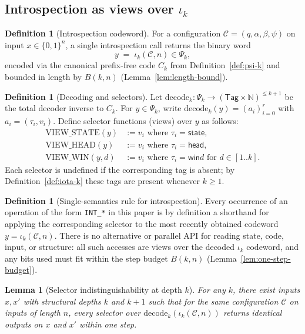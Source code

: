 \documentclass[11pt]{article}
\newtheorem{lemma}[theorem]{Lemma}
\theoremstyle{definition}
\newtheorem{definition}[theorem]{Definition}
\newcommand{\bits}{\{0,1\}}
\begin{document}
\subsection{Introspection as views over $\iota_k$}

\begin{definition}[Introspection codeword]
For a configuration $\mathcal{C}=(q,\alpha,\beta,\psi)$ on input $x\in\bits^n$, a single introspection call returns the binary word
\[
y \;=\; \iota_k(\mathcal{C},n)\in\Psi_k,
\]
encoded via the canonical prefix-free code $C_k$ from Definition~\ref{def:psi-k} and bounded in length by $B(k,n)$ (Lemma~\ref{lem:length-bound}).
\end{definition}

\begin{definition}[Decoding and selectors]
Let $\mathrm{decode}_k: \Psi_k \to (\mathsf{Tag}\times\mathbb{N})^{\le k+1}$ be the total decoder inverse to $C_k$. For $y\in\Psi_k$, write $\mathrm{decode}_k(y)=(a_i)_{i=0}^{r}$ with $a_i=(\tau_i,v_i)$. Define selector functions (views) over $y$ as follows:
\begin{align*}
\mathrm{VIEW\_STATE}(y) &:= v_i \text{ where } \tau_i=\textsf{state}, \\
\mathrm{VIEW\_HEAD}(y) &:= v_i \text{ where } \tau_i=\textsf{head}, \\
\mathrm{VIEW\_WIN}(y,d) &:= v_i \text{ where } \tau_i=\textsf{win}d \text{ for } d\in[1..k].
\end{align*}
Each selector is undefined if the corresponding tag is absent; by Definition~\ref{def:iota-k} these tags are present whenever $k\ge 1$.
\end{definition}

\begin{definition}[Single-semantics rule for introspection]
Every occurrence of an operation of the form \texttt{INT\_*} in this paper is by definition a shorthand for applying the corresponding selector to the most recently obtained codeword $y=\iota_k(\mathcal{C},n)$. There is no alternative or parallel API for reading state, code, input, or structure: all such accesses are views over the decoded $\iota_k$ codeword, and any bits used must fit within the step budget $B(k,n)$ (Lemma~\ref{lem:one-step-budget}).
\end{definition}

\begin{lemma}[Selector indistinguishability at depth $k$]
\label{lem:selector-indistinguishability}
For any $k$, there exist inputs $x,x'$ with structural depths $k$ and $k{+}1$ such that for the same configuration $\mathcal{C}$ on inputs of length $n$, every selector over $\mathrm{decode}_k(\iota_k(\mathcal{C},n))$ returns identical outputs on $x$ and $x'$ within one step.
\end{lemma}
\end{document}
